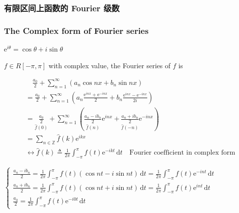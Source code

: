 \subsubsection{有限区间上函数的 Fourier 级数}

\subsubsection[Fourier 级数的复数形式]{The Complex form of Fourier series}

$\mathrm{e}^{i\theta}=\cos\theta+i\sin\theta$

$f\in R[-\pi,\pi]$ with complex value, the Fourier series of $f$ is

\begin{align*}
     & \quad\frac{a_0}{2}+\sum_{n=1}^{\infty}\left(a_n\cos nx+b_n\sin nx\right)                                                                                                                    \\
     & =\frac{a_0}{2}+\sum_{n=1}^{\infty}\left(a_n\frac{\mathrm{e}^{inx}+\mathrm{e}^{-inx}}{2}+b_n\frac{\mathrm{e}^{inx}-\mathrm{e}^{-inx}}{2i}\right)                                             \\
     & =\underset{\hat{f}(0)}{\frac{a_0}{2}}+\sum_{n=1}^{\infty}\left(\underset{\hat{f}(n)}{\frac{a_n-ib_n}{2}}\mathrm{e}^{inx}+\underset{\hat{f}(-n)}{\frac{a_n+ib_n}{2}}\mathrm{e}^{-inx}\right) \\
     & =\sum_{n\in\mathbb{Z}}\hat{f}(k)\mathrm{e}^{ikx}                                                                                                                                            \\
     & \leftrightarrow\hat{f}(k)\triangleq\frac{1}{2\pi}\int_{-\pi}^{\pi}f(t)\mathrm{e}^{-ikt}\,\mathrm{d}t\quad\text{Fourier coefficient in complex form}
\end{align*}

$\begin{cases}
        \frac{a_n-ib_n}{2}=\frac{1}{2\pi}\int_{-\pi}^{\pi}f(t)\left(\cos nt-i\sin nt\right)\,\mathrm{d}t=\frac{1}{2\pi}\int_{-\pi}^{\pi}f(t)\mathrm{e}^{-int}\,\mathrm{d}t \\
        \frac{a_n+ib_n}{2}=\frac{1}{2\pi}\int_{-\pi}^{\pi}f(t)\left(\cos nt+i\sin nt\right)\,\mathrm{d}t=\frac{1}{2\pi}\int_{-\pi}^{\pi}f(t)\mathrm{e}^{int}\,\mathrm{d}t  \\
        \frac{a_0}{2}=\frac{1}{2\pi}\int_{-\pi}^{\pi}f(t)\mathrm{e}^{-i0t}\,\mathrm{d}t
    \end{cases}$

